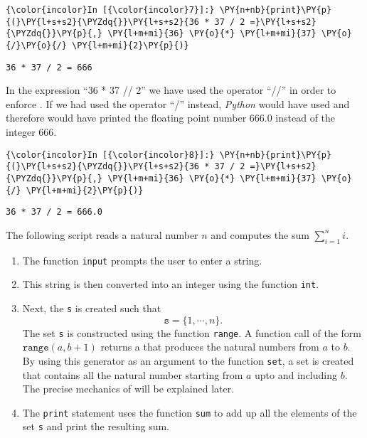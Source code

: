     \begin{Verbatim}[commandchars=\\\{\}]
{\color{incolor}In [{\color{incolor}7}]:} \PY{n+nb}{print}\PY{p}{(}\PY{l+s+s2}{\PYZdq{}}\PY{l+s+s2}{36 * 37 / 2 =}\PY{l+s+s2}{\PYZdq{}}\PY{p}{,} \PY{l+m+mi}{36} \PY{o}{*} \PY{l+m+mi}{37} \PY{o}{/}\PY{o}{/} \PY{l+m+mi}{2}\PY{p}{)}
\end{Verbatim}

\begin{Verbatim}[commandchars=\\\{\}]
36 * 37 / 2 = 666
\end{Verbatim}

In the expression ``36 * 37 // 2'' we have used the operator ``//'' in order
to enforce . If we had used the operator ``/''
instead, \textsl{Python} would have used 
and therefore would have printed the floating point number 666.0 instead
of the integer 666.

\begin{Verbatim}[commandchars=\\\{\}]
{\color{incolor}In [{\color{incolor}8}]:} \PY{n+nb}{print}\PY{p}{(}\PY{l+s+s2}{\PYZdq{}}\PY{l+s+s2}{36 * 37 / 2 =}\PY{l+s+s2}{\PYZdq{}}\PY{p}{,} \PY{l+m+mi}{36} \PY{o}{*} \PY{l+m+mi}{37} \PY{o}{/} \PY{l+m+mi}{2}\PY{p}{)}
\end{Verbatim}

\begin{Verbatim}[commandchars=\\\{\}]
36 * 37 / 2 = 666.0
\end{Verbatim}

\noindent
The following script reads a natural number \(n\) and computes the sum
\(\sum\limits_{i=1}^n i\).
\begin{enumerate}
\item The function \texttt{input} prompts the user to enter a string.
\item This string is then converted into an integer using the function \texttt{int}.
\item Next, the  \texttt{s} is created such that 
      $$\texttt{s} = \{1, \cdots, n\}. $$  
      The set \texttt{s} is constructed using the function \texttt{range}.  A function call 
      of the form $\texttt{range}(a, b + 1)$ returns a  that produces the natural numbers 
      from $a$ to $b$.  By using this generator as an argument to the function \texttt{set}, a set is created 
      that contains all the natural number starting from $a$ upto and including $b$.
      The precise mechanics of  will be explained later.
\item The \texttt{print} statement uses the function \texttt{sum} to add up all the elements of the
      set \texttt{s} and print the resulting sum.
\end{enumerate}

